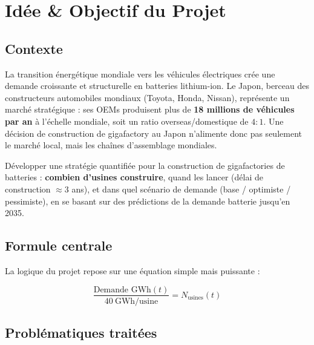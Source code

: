 \documentclass[12pt,a4paper]{article}
\begin{document}
\section{Idée \& Objectif du Projet}

\subsection{Contexte}

La transition énergétique mondiale vers les véhicules électriques crée une demande croissante et
structurelle en batteries lithium-ion. Le Japon, berceau des constructeurs automobiles mondiaux
(Toyota, Honda, Nissan), représente un marché stratégique : ses OEMs produisent plus de
\textbf{18 millions de véhicules par an} à l'échelle mondiale, soit un ratio overseas/domestique de
$4:1$. Une décision de construction de gigafactory au Japon n'alimente donc pas seulement le
marché local, mais les chaînes d'assemblage mondiales.

\begin{objectifbox}
Développer une stratégie quantifiée pour la construction de gigafactories de batteries :
\textbf{combien d'usines construire}, quand les lancer (délai de construction $\approx 3$ ans),
et dans quel scénario de demande (base / optimiste / pessimiste), en se basant sur des
prédictions de la demande batterie jusqu'en 2035.
\end{objectifbox}

\subsection{Formule centrale}

La logique du projet repose sur une équation simple mais puissante :

\begin{formulebox}
\begin{equation}
  \frac{\text{Demande GWh}(t)}{40\ \text{GWh/usine}} = N_{\text{usines}}(t)
\end{equation}
\end{formulebox}

\subsection{Problématiques traitées}
\end{document}
